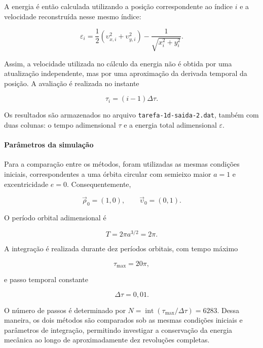 \documentclass[12pt,a4paper]{article}
\begin{document}
A energia é então calculada utilizando a posição correspondente ao índice $i$ e a velocidade reconstruída nesse mesmo índice:

\begin{equation}
    \varepsilon_i=
    \frac{1}{2}\left(\upsilon_{x,i}^2+\upsilon_{y,i}^2\right)
    -\frac{1}{\sqrt{x_i^2+y_i^2}}.
\end{equation}

Assim, a velocidade utilizada no cálculo da energia não é obtida por uma atualização independente, mas por uma aproximação da derivada temporal da posição. A avaliação é realizada no instante

\begin{equation}
    \tau_i=(i-1)\Delta\tau.
\end{equation}

Os resultados são armazenados no arquivo \texttt{tarefa-1d-saida-2.dat}, também com duas colunas: o tempo adimensional $\tau$ e a energia total adimensional $\varepsilon$.

\paragraph{Parâmetros da simulação}

Para a comparação entre os métodos, foram utilizadas as mesmas condições iniciais, correspondentes a uma órbita circular com semieixo maior $a=1$ e excentricidade $e=0$. Consequentemente,

\begin{equation}
    \vec{\rho}_0=(1,0),
    \qquad
    \vec{\upsilon}_0=(0,1).
\end{equation}

O período orbital adimensional é

\begin{equation}
    T=2\pi a^{3/2}=2\pi.
\end{equation}

A integração é realizada durante dez períodos orbitais, com tempo máximo

\begin{equation}
    \tau_{\max}=20\pi,
\end{equation}

e passo temporal constante

\begin{equation}
    \Delta\tau=0,01.
\end{equation}

O número de passos é determinado por $N=\operatorname{int}(\tau_{\max}/\Delta\tau)=6283$. Dessa maneira, os dois métodos são comparados sob as mesmas condições iniciais e parâmetros de integração, permitindo investigar a conservação da energia mecânica ao longo de aproximadamente dez revoluções completas.
\end{document}
